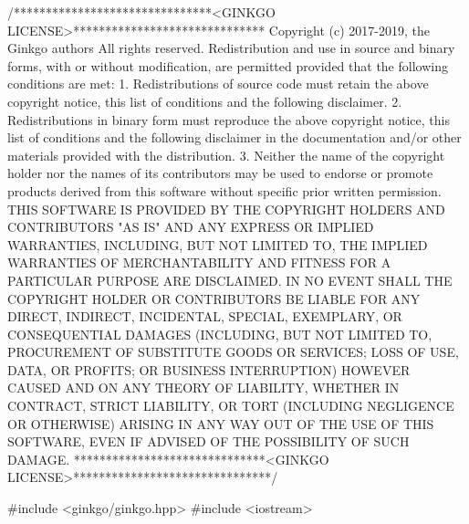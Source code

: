 \begin{DoxyCodeInclude}
\textcolor{comment}{/*******************************<GINKGO LICENSE>******************************}
\textcolor{comment}{Copyright (c) 2017-2019, the Ginkgo authors}
\textcolor{comment}{All rights reserved.}
\textcolor{comment}{}
\textcolor{comment}{Redistribution and use in source and binary forms, with or without}
\textcolor{comment}{modification, are permitted provided that the following conditions}
\textcolor{comment}{are met:}
\textcolor{comment}{}
\textcolor{comment}{1. Redistributions of source code must retain the above copyright}
\textcolor{comment}{notice, this list of conditions and the following disclaimer.}
\textcolor{comment}{}
\textcolor{comment}{2. Redistributions in binary form must reproduce the above copyright}
\textcolor{comment}{notice, this list of conditions and the following disclaimer in the}
\textcolor{comment}{documentation and/or other materials provided with the distribution.}
\textcolor{comment}{}
\textcolor{comment}{3. Neither the name of the copyright holder nor the names of its}
\textcolor{comment}{contributors may be used to endorse or promote products derived from}
\textcolor{comment}{this software without specific prior written permission.}
\textcolor{comment}{}
\textcolor{comment}{THIS SOFTWARE IS PROVIDED BY THE COPYRIGHT HOLDERS AND CONTRIBUTORS "AS}
\textcolor{comment}{IS" AND ANY EXPRESS OR IMPLIED WARRANTIES, INCLUDING, BUT NOT LIMITED}
\textcolor{comment}{TO, THE IMPLIED WARRANTIES OF MERCHANTABILITY AND FITNESS FOR A}
\textcolor{comment}{PARTICULAR PURPOSE ARE DISCLAIMED. IN NO EVENT SHALL THE COPYRIGHT}
\textcolor{comment}{HOLDER OR CONTRIBUTORS BE LIABLE FOR ANY DIRECT, INDIRECT, INCIDENTAL,}
\textcolor{comment}{SPECIAL, EXEMPLARY, OR CONSEQUENTIAL DAMAGES (INCLUDING, BUT NOT}
\textcolor{comment}{LIMITED TO, PROCUREMENT OF SUBSTITUTE GOODS OR SERVICES; LOSS OF USE,}
\textcolor{comment}{DATA, OR PROFITS; OR BUSINESS INTERRUPTION) HOWEVER CAUSED AND ON ANY}
\textcolor{comment}{THEORY OF LIABILITY, WHETHER IN CONTRACT, STRICT LIABILITY, OR TORT}
\textcolor{comment}{(INCLUDING NEGLIGENCE OR OTHERWISE) ARISING IN ANY WAY OUT OF THE USE}
\textcolor{comment}{OF THIS SOFTWARE, EVEN IF ADVISED OF THE POSSIBILITY OF SUCH DAMAGE.}
\textcolor{comment}{******************************<GINKGO LICENSE>*******************************/}

\textcolor{preprocessor}{#include <ginkgo/ginkgo.hpp>}
\textcolor{preprocessor}{#include <iostream>}


\end{DoxyCodeInclude}
